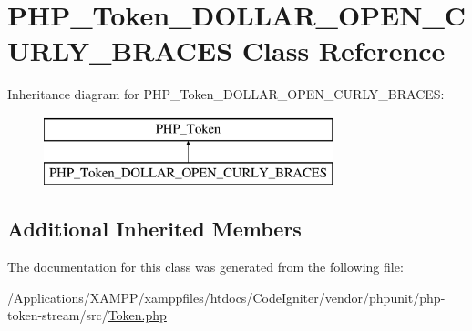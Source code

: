 \hypertarget{class_p_h_p___token___d_o_l_l_a_r___o_p_e_n___c_u_r_l_y___b_r_a_c_e_s}{}\section{P\+H\+P\+\_\+\+Token\+\_\+\+D\+O\+L\+L\+A\+R\+\_\+\+O\+P\+E\+N\+\_\+\+C\+U\+R\+L\+Y\+\_\+\+B\+R\+A\+C\+ES Class Reference}
\label{class_p_h_p___token___d_o_l_l_a_r___o_p_e_n___c_u_r_l_y___b_r_a_c_e_s}
Inheritance diagram for P\+H\+P\+\_\+\+Token\+\_\+\+D\+O\+L\+L\+A\+R\+\_\+\+O\+P\+E\+N\+\_\+\+C\+U\+R\+L\+Y\+\_\+\+B\+R\+A\+C\+ES\+:\begin{figure}[H]
\begin{center}
\leavevmode
\includegraphics[height=2.000000cm]{class_p_h_p___token___d_o_l_l_a_r___o_p_e_n___c_u_r_l_y___b_r_a_c_e_s}
\end{center}
\end{figure}
\subsection*{Additional Inherited Members}


The documentation for this class was generated from the following file\+:\begin{DoxyCompactItemize}
\item 
/\+Applications/\+X\+A\+M\+P\+P/xamppfiles/htdocs/\+Code\+Igniter/vendor/phpunit/php-\/token-\/stream/src/\mbox{\hyperlink{_token_8php}{Token.\+php}}\end{DoxyCompactItemize}
